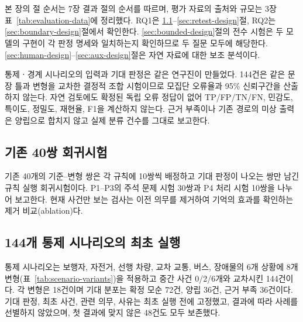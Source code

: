 \section{}
\label{sec:experiments}

\begin{revision}

본 장의 절 순서는 7장 결과 절의 순서를 따르며, 평가 자료의 출처와 규모는 3장 표~\ref{tab:evaluation-data}에 정리했다. RQ1은 \ref{sec:legacy-test}--\ref{sec:retest-design}절, RQ2는 \ref{sec:boundary-design}절에서 확인한다. \ref{sec:bounded-design}절의 전수 시험은 두 모델의 구현이 각 판정 명세와 일치하는지 확인하므로 두 질문 모두에 해당한다. \ref{sec:human-design}--\ref{sec:aux-design}절은 자연 자료에 대한 보조 분석이다.

통제ㆍ경계 시나리오의 입력과 기대 판정은 같은 연구진이 만들었다. 144건은 같은 문장 틀과 변형을 교차한 결정적 조합 시험이므로 모집단 오류율과 95\% 신뢰구간을 산출하지 않는다. 자연 검토에도 확정된 독립 오류 정답이 없어 TP/FP/TN/FN, 민감도, 특이도, 정밀도, 재현율, F1을 계산하지 않는다. 근거 부족이나 기존 경로의 미상 출력은 양립으로 합치지 않고 실제 분류 건수를 그대로 보고한다.

\subsection{기존 40쌍 회귀시험}
\label{sec:legacy-test}
기존 40개의 기준--변형 쌍은 각 규칙에 10쌍씩 배정하고 기대 판정이 나오는 쌍만 남긴 규칙 실행 회귀시험이다. P1--P3의 주석 문제 시험 30쌍과 P4 처리 시험 10쌍을 나누어 보고한다. 현재 사건만 보는 검사는 이전 의무를 제거하여 기억의 효과를 확인하는 제거 비교(ablation)다.

\subsection{144개 통제 시나리오의 최초 실행}
\label{sec:scenario-design}
통제 시나리오는 보행자, 자전거, 선행 차량, 교차 교통, 버스, 장애물의 6개 상황에 8개 변형(표~\ref{tab:scenario-variants})을 적용하고 중간 사건 0/2/6개와 교차시킨 144건이다. 각 변형은 18건이며 기대 분포는 확정 모순 72건, 양립 36건, 근거 부족 36건이다. 기대 판정, 최초 사건, 관련 의무, 사유는 최초 실행 전에 고정했고, 결과에 따라 사례를 선별하지 않았으며, 첫 결과에 맞지 않은 48건도 모두 보존했다.


\end{revision}
